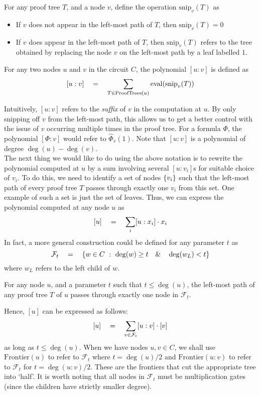 \begin{definition}
For any proof tree $T$, and a node $v$, define the operation $\mathrm{snip}_v(T)$ as
\begin{itemize}
  \item If $v$ does not appear in the left-most path of $T$, then $\mathrm{snip}_v(T) = 0$
  \item If $v$ does appear in the left-most path of $T$, then $\mathrm{snip}_v(T)$ refers to the tree obtained by replacing the node $v$ on the left-most path by a leaf labelled $1$. 
\end{itemize}
For any two nodes $u$ and $v$ in the circuit $C$, the polynomial $[u:v]$ is defined as
\[
[u:v] \quad = \quad \sum_{T \in \mathrm{ProofTrees}(u)} \mathrm{eval}(\mathrm{snip}_v(T))
\]
\end{definition}

Intuitively, $[u:v]$ refers to the \emph{suffix} of $v$ in the computation at $u$. By only snipping off $v$ from the left-most path, this allows us to get a better control with the issue of $v$ occurring multiple times in the proof tree. For a formula $\Phi$, the polynomial $[\Phi:v]$ would refer to $\hat{\Phi}_v(1)$. Note that $[u:v]$ is a polynomial of degree $\deg(u) - \deg(v)$. \\

The next thing we would like to do using the above notation is to rewrite the polynomial computed at $u$ by a sum involving several $[u:v_i]$s for suitable choice of $v_i$. To do this, we need to identify a set of nodes $\left\{v_i\right\}$ such that the left-most path of every proof tree $T$ passes through exactly one $v_i$ from this set. One example of such a set is just the set of leaves. Thus, we can express the polynomial computed at any node $u$ as
\[
[u] \quad = \quad \sum_{i} [u:x_i] \cdot x_i
\]
In fact, a more general construction could be defined for any parameter $t$ as
\[
\mathcal{F}_t  \quad = \quad \left\{{w\in C}\ : \ {\deg(w) \geq t \quad \& \quad \deg(w_L) < t}\right\}
\]
where $w_L$ refers to the left child of $w$. 

\begin{observation}\label{obs:vsbr-split-threshold}
For any node $u$, and a parameter $t$ such that $t \leq \deg(u)$, the left-most path of any proof tree $T$ of $u$ passes through exactly one node in $\mathcal{F}_t$. 
\end{observation}

Hence, $[u]$ can be expressed as follows:
\begin{equation}\label{eqn:vsbr-split-threshold}
[u] \quad = \quad \sum_{v\in \mathcal{F}_t} [u:v] \cdot [v]
\end{equation}
as long as $t \leq \deg(u)$. When we have nodes $u,v \in C$, we shall use $\mathrm{Frontier}(u)$ to refer to $\mathcal{F}_t$ where $t = \deg(u)/2$ and $\mathrm{Frontier}(u:v)$ to refer to $\mathcal{F}_t$ for $t = \deg(u:v)/2$. These are the frontiers that cut the appropriate tree into `half'. It is worth noting that all nodes in $\mathcal{F}_t$ must be multiplication gates (since the children have strictly smaller degree). 


